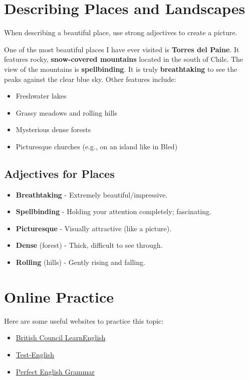 \section{Describing Places and Landscapes}

When describing a beautiful place, use strong adjectives to create a picture.

\begin{readingbox}[title=Sample Description: Torres del Paine]
One of the most beautiful places I have ever visited is \textbf{Torres del Paine}. It features rocky, \textbf{snow-covered mountains} located in the south of Chile.
The view of the mountains is \textbf{spellbinding}. It is truly \textbf{breathtaking} to see the peaks against the clear blue sky.
Other features include:
\begin{itemize}
    \item Freshwater lakes
    \item Grassy meadows and rolling hills
    \item Mysterious dense forests
    \item Picturesque churches (e.g., on an island like in Bled)
\end{itemize}
\end{readingbox}

\subsection{Adjectives for Places}
\begin{itemize}
    \item \textbf{Breathtaking} - Extremely beautiful/impressive.
    \item \textbf{Spellbinding} - Holding your attention completely; fascinating.
    \item \textbf{Picturesque} - Visually attractive (like a picture).
    \item \textbf{Dense} (forest) - Thick, difficult to see through.
    \item \textbf{Rolling} (hills) - Gently rising and falling.
\end{itemize}


\section{Online Practice}
Here are some useful websites to practice this topic:
\begin{itemize}
    \item \href{https://learnenglish.britishcouncil.org/grammar}{British Council LearnEnglish}
    \item \href{https://test-english.com/}{Test-English}
    \item \href{https://www.perfect-english-grammar.com/}{Perfect English Grammar}
\end{itemize}
